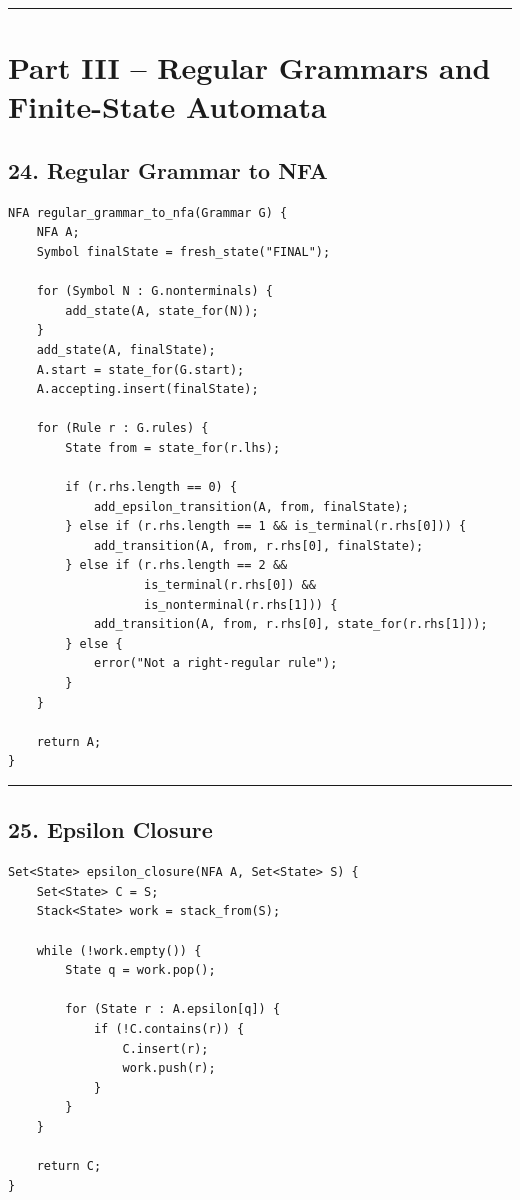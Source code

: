 \documentclass[10pt,letterpaper]{article}
\begin{document}
\medskip\hrule\medskip

\clearpage
\section*{Part III -- Regular Grammars and Finite-State Automata}

\subsection*{24. Regular Grammar to NFA}

\begin{verbatim}
NFA regular_grammar_to_nfa(Grammar G) {
    NFA A;
    Symbol finalState = fresh_state("FINAL");

    for (Symbol N : G.nonterminals) {
        add_state(A, state_for(N));
    }
    add_state(A, finalState);
    A.start = state_for(G.start);
    A.accepting.insert(finalState);

    for (Rule r : G.rules) {
        State from = state_for(r.lhs);

        if (r.rhs.length == 0) {
            add_epsilon_transition(A, from, finalState);
        } else if (r.rhs.length == 1 && is_terminal(r.rhs[0])) {
            add_transition(A, from, r.rhs[0], finalState);
        } else if (r.rhs.length == 2 &&
                   is_terminal(r.rhs[0]) &&
                   is_nonterminal(r.rhs[1])) {
            add_transition(A, from, r.rhs[0], state_for(r.rhs[1]));
        } else {
            error("Not a right-regular rule");
        }
    }

    return A;
}
\end{verbatim}

\medskip\hrule\medskip

\subsection*{25. Epsilon Closure}

\begin{verbatim}
Set<State> epsilon_closure(NFA A, Set<State> S) {
    Set<State> C = S;
    Stack<State> work = stack_from(S);

    while (!work.empty()) {
        State q = work.pop();

        for (State r : A.epsilon[q]) {
            if (!C.contains(r)) {
                C.insert(r);
                work.push(r);
            }
        }
    }

    return C;
}
\end{verbatim}
\end{document}
